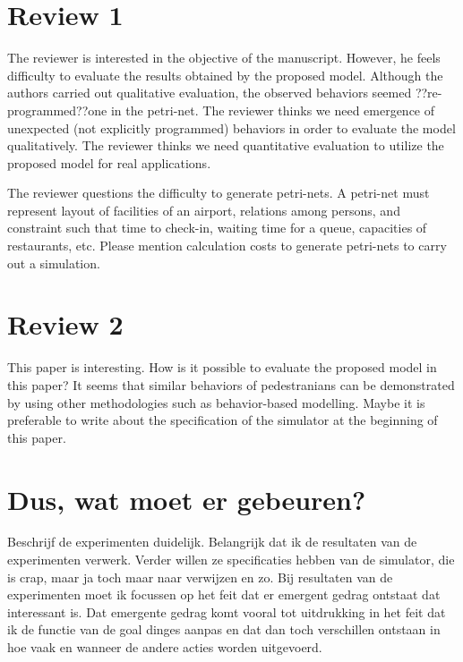 \documentclass[11pt]{article}
\begin{document}
\maketitle

\section{Review 1}
The reviewer is interested in the objective of the manuscript. However, he feels difficulty to evaluate the results obtained by the proposed model. Although the authors carried out qualitative evaluation, the observed behaviors seemed ??re-programmed??one in the petri-net. The reviewer thinks we need emergence of unexpected (not explicitly programmed) behaviors in order to evaluate the model qualitatively. The reviewer thinks we need quantitative evaluation to utilize the proposed model for real applications.

The reviewer questions the difficulty to generate petri-nets. A petri-net must represent layout of facilities of an airport, relations among persons, and constraint such that time to check-in, waiting time for a queue, capacities of restaurants, etc. Please mention calculation costs to generate petri-nets to carry out a simulation.

\section{Review 2}
This paper is interesting. How is it possible to evaluate the proposed model in this paper? It seems that similar behaviors of pedestranians can be demonstrated by using other methodologies such as behavior-based modelling. Maybe it is preferable to write about the specification of the simulator at the beginning of this paper.

\section{Dus, wat moet er gebeuren?}
Beschrijf de experimenten duidelijk. Belangrijk dat ik de resultaten van de experimenten verwerk. 
Verder willen ze specificaties hebben van de simulator, die is crap, maar ja toch maar naar verwijzen en zo.
Bij resultaten van de experimenten moet ik focussen op het feit dat er emergent gedrag ontstaat dat interessant is. Dat emergente gedrag komt vooral tot uitdrukking in het feit dat ik de functie van de goal dinges aanpas en dat dan toch verschillen ontstaan in hoe vaak en wanneer de andere acties worden uitgevoerd. 
\end{document}
